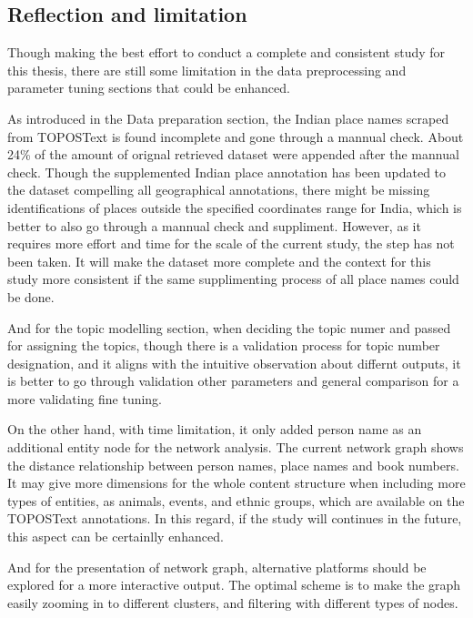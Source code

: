\documentclass[
  12pt,
]{article}
\begin{document}
\hypertarget{reflection-and-limitation}{%
\subsection{Reflection and limitation}\label{reflection-and-limitation}}

Though making the best effort to conduct a complete and consistent study
for this thesis, there are still some limitation in the data
preprocessing and parameter tuning sections that could be enhanced.

As introduced in the Data preparation section, the Indian place names
scraped from TOPOSText is found incomplete and gone through a mannual
check. About 24\% of the amount of orignal retrieved dataset were
appended after the mannual check. Though the supplemented Indian place
annotation has been updated to the dataset compelling all geographical
annotations, there might be missing identifications of places outside
the specified coordinates range for India, which is better to also go
through a mannual check and suppliment. However, as it requires more
effort and time for the scale of the current study, the step has not
been taken. It will make the dataset more complete and the context for
this study more consistent if the same supplimenting process of all
place names could be done.

And for the topic modelling section, when deciding the topic numer and
passed for assigning the topics, though there is a validation process
for topic number designation, and it aligns with the intuitive
observation about differnt outputs, it is better to go through
validation other parameters and general comparison for a more validating
fine tuning.

On the other hand, with time limitation, it only added person name as an
additional entity node for the network analysis. The current network
graph shows the distance relationship between person names, place names
and book numbers. It may give more dimensions for the whole content
structure when including more types of entities, as animals, events, and
ethnic groups, which are available on the TOPOSText annotations. In this
regard, if the study will continues in the future, this aspect can be
certainlly enhanced.

And for the presentation of network graph, alternative platforms should
be explored for a more interactive output. The optimal scheme is to make
the graph easily zooming in to different clusters, and filtering with
different types of nodes.
\end{document}
